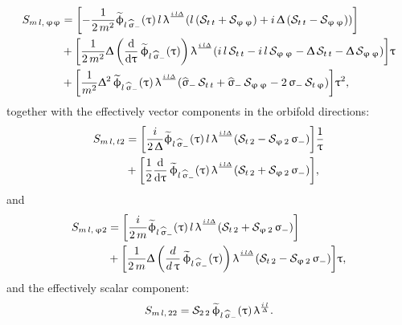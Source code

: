\begin{equation}
  \begin{split}
    S_{m\, l,\, \upvarphi\upvarphi}
    & =
    \qty[
      -
      \frac{1}{2\,m^2}
      \widetilde{\upphi}_{l\, \widehat{\upsigma}_-}(\uptau)\,
      l\,
      \uplambda^\frac{{i\,l}{\Updelta}}\,
      \qty(
      l\, ( \mathcal{S}_{t\,t} +\mathcal{S}_{\upvarphi\,\upvarphi} )
      +i\,\Updelta\, ( \mathcal{S}_{t\,t} - \mathcal{S}_{\upvarphi\,\upvarphi} )
      )
    ]
    \\
    & +
    \qty[
      \frac{1}{2\,m^2}
      \Updelta\,
      \qty(\dv{\ensuremath{\uptau}}\,\widetilde{\upphi}_{l\, \widehat{\upsigma}_-}(\uptau))\,
      \uplambda^\frac{{i\,l}{\Updelta}}\,
      \qty(
      i\,l\,\mathcal{S}_{t\,t}
      -i\,l\,\mathcal{S}_{\upvarphi\,\upvarphi}
      -\Updelta\,\mathcal{S}_{t\,t}
      -\Updelta\,\mathcal{S}_{\upvarphi\,\upvarphi}
      )
    ]
    \uptau
    \\
    & +
    \qty[
      \frac{1}{m^2}
      \Updelta^2\,
      \widetilde{\upphi}_{l\, \widehat{\upsigma}_-}(\uptau)\,
      \uplambda^\frac{{i\,l}{\Updelta}}\,
      \qty(
      \widehat{\upsigma}_-\,\mathcal{S}_{t\,t}
      +\widehat{\upsigma}_-\,\mathcal{S}_{\upvarphi\,\upvarphi}
      -2\,\upsigma_-\,\mathcal{S}_{t\,\upvarphi}
      )
    ]
    \uptau^2,
  \end{split}
\end{equation}
together with the effectively vector components in the orbifold directions:
\begin{equation}
  \begin{split}
    S_{m\, l,\, t2}
    & =
    \qty[
      \frac{i}{2\,\Updelta}
      \widetilde{\upphi}_{l\, \widehat{\upsigma}_-}(\uptau)\,
      l\,
      \uplambda^\frac{{i\,l}{\Updelta}}\,
      \qty(\mathcal{S}_{t\,2}-\mathcal{S}_{\upvarphi\,2}\,\upsigma_-)
    ]
    \frac{1}{\uptau}
    \\
    & +
    \qty[
      \frac{1}{2}
      \dv{\ensuremath{\uptau}}\,\widetilde{\upphi}_{l\, \widehat{\upsigma}_-}(\uptau)\,
      \uplambda^\frac{{i\,l}{\Updelta}}\,
      \qty(\mathcal{S}_{t\,2}+\mathcal{S}_{\upvarphi\,2}\,\upsigma_-)
    ],
  \end{split}
\end{equation}
and
\begin{equation}
  \begin{split}
    S_{m\, l,\, \upvarphi 2}
    & =
    \qty[
      \frac{i}{2\,m}
      \widetilde{\upphi}_{l\, \widehat{\upsigma}_-}(\uptau)\,
      l\,
      \uplambda^\frac{{i\,l}{\Updelta}}\,
      \qty(\mathcal{S}_{t\,2}+\mathcal{S}_{\upvarphi\,2}\,\upsigma_-)
    ]
    \\
    & +
    \qty[
      \frac{1}{2\,m}
      \Updelta\,
      \qty(\frac{d}{d\,\uptau}\,\widetilde{\upphi}_{l\, \widehat{\upsigma}_-}(\uptau))\,
      \uplambda^\frac{{i\,l}{\Updelta}}\,
      \qty(\mathcal{S}_{t\,2}-\mathcal{S}_{\upvarphi\,2}\,\upsigma_-)
    ]
    \uptau,
  \end{split}
\end{equation}
and the effectively scalar component:
\begin{equation}
  S_{m\, l,\, 22}
  =
  \mathcal{S}_{2\,2}\,
  \widetilde{\upphi}_{l\, \widehat{\upsigma}_-}(\uptau)\,
  \uplambda^\frac{i\,l}{\Updelta}.
\end{equation}



